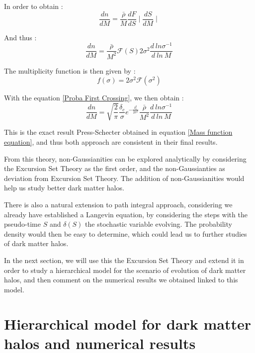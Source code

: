 In order to obtain :
\begin{equation}
\label{PS Hmf EST}
\frac{dn}{dM} = \frac{\bar{\rho}}{M} \frac{dF}{dS} \mid \frac{dS}{dM} \mid
\end{equation}

And thus :
\begin{equation}
\label{PS Hmf EST 2}
\frac{dn}{dM} = \frac{\bar{\rho}}{M^2} \mathcal{F}(S) 2\sigma^2 \frac{d \ ln \sigma^{-1}}{d\ ln \ M}
\end{equation}

The multiplicity function is then given by :
\begin{equation}
\label{Multiplicity Func}
f(\sigma) = 2 \sigma^2 \mathcal{F}(\sigma^2)
\end{equation}

With the equation \ref{Proba First Crossing}, we then obtain :
\begin{equation}
\label{PS Same}
\frac{dn}{dM} = \sqrt{\frac{2}{\pi}} \frac{\delta_c}{\sigma} e^{-\frac{\delta_c^2}{2\sigma^2}} \frac{\bar{\rho}}{M^2} \frac{d \ ln \sigma^{-1}}{d\ ln \ M}
\end{equation}

This is the exact result Press-Schecter obtained in equation \ref{Mass function equation}, and thus both approach are consistent in their final results.

From this theory, non-Gaussianities can be explored analytically by considering the Excursion Set Theory as the first order, and the non-Gaussianties as deviation from Excursion Set Theory. The addition of non-Gaussianities would help us study better dark matter halos.

There is also a natural extension to path integral approach, considering we already have established a Langevin equation, by considering the steps with the pseudo-time $S$ and $\delta(S)$ the stochastic variable evolving. The probability density would then be easy to determine, which could lead us to further studies of dark matter halos\cite{Maggiore}.

In the next section, we will use this the Excursion Set Theory and extend it in order to study a hierarchical model for the scenario of evolution of dark matter halos, and then comment on the numerical results we obtained linked to this model.




\section{Hierarchical model for dark matter halos and numerical results}
\label{Section III}

